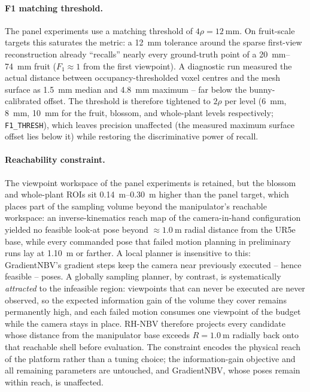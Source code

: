 \paragraph{F1 matching threshold.} The panel experiments use a matching
threshold of $4\rho = \SI{12}{\milli\metre}$. On fruit-scale targets this
saturates the metric: a \SI{12}{\milli\metre} tolerance around the sparse
first-view reconstruction already ``recalls'' nearly every ground-truth point
of a \SIrange{20}{74}{\milli\metre} fruit ($F_1 \approx 1$ from the first
viewpoint). A diagnostic run measured the actual distance between
occupancy-thresholded voxel centres and the mesh surface as
\SI{1.5}{\milli\metre} median and \SI{4.8}{\milli\metre} maximum -- far below
the bunny-calibrated offset. The threshold is therefore tightened to
$2\rho$ per level (\SI{6}{\milli\metre}, \SI{8}{\milli\metre},
\SI{10}{\milli\metre} for the fruit, blossom, and whole-plant levels
respectively; \texttt{F1\_THRESH}), which leaves precision unaffected (the
measured maximum surface offset lies below it) while restoring the
discriminative power of recall.\\

\paragraph{Reachability constraint.} The viewpoint workspace of the panel
experiments is retained, but the blossom and whole-plant ROIs sit
\SIrange{0.14}{0.30}{\metre} higher than the panel target, which places part
of the sampling volume beyond the manipulator's reachable workspace: an
inverse-kinematics reach map of the camera-in-hand configuration yielded no
feasible look-at pose beyond $\approx\SI{1.0}{\metre}$ radial distance from
the UR5e base, while every commanded pose that failed motion planning in
preliminary runs lay at \SI{1.10}{\metre} or farther. A local planner is
insensitive to this: GradientNBV's gradient steps keep the camera near
previously executed -- hence feasible -- poses. A globally sampling planner,
by contrast, is systematically \emph{attracted} to the infeasible region:
viewpoints that can never be executed are never observed, so the expected
information gain of the volume they cover remains permanently high, and each
failed motion consumes one viewpoint of the budget while the camera stays in
place. RH-NBV therefore projects every candidate whose distance from the
manipulator base exceeds $R = \SI{1.0}{\metre}$ radially back onto that
reachable shell before evaluation. The constraint encodes the physical reach
of the platform rather than a tuning choice; the information-gain objective
and all remaining parameters are untouched, and GradientNBV, whose poses
remain within reach, is unaffected.\\


